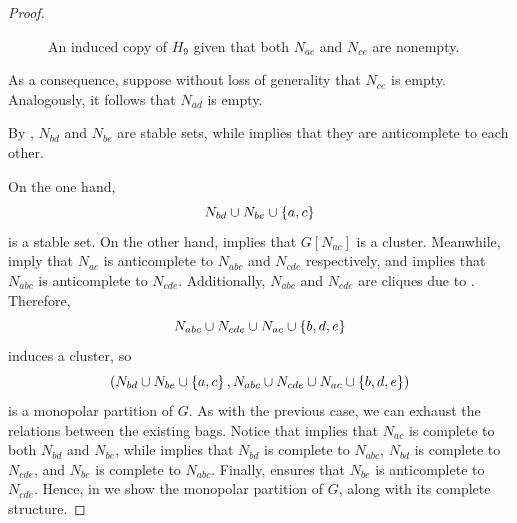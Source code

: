\begin{proof}
\begin{figure}[htb!]
        \caption{An induced copy of $H_9$ given that both $N_{ac}$ and $N_{ce}$ are nonempty.}
        \label{fig:two_2_bags_nonempty}
    \end{figure}

    As a consequence, suppose without loss of generality that $N_{ce}$ is empty.
    Analogously, it follows that $N_{ad}$ is empty.

    By , $N_{bd}$ and $N_{be}$ are stable sets, while
     implies that they are anticomplete to each other.
    
    On the one hand,
    \[
        N_{bd} \cup N_{be} \cup \left\{a,c\right\}
    \]
    is a stable set. On the other hand,  implies that
    $G[N_{ac}]$ is a cluster. Meanwhile,
     imply that $N_{ac}$ is
    anticomplete to $N_{abc}$ and $N_{cde}$ respectively, and
     implies that $N_{abc}$ is anticomplete to
    $N_{cde}$. Additionally, $N_{abc}$ and $N_{cde}$ are cliques due to
    . Therefore, 
    \[
        N_{abc}\cup N_{cde} \cup N_{ac} \cup \left\{b,d,e\right\}
    \]
    induces a cluster, so
    \[
        \left(N_{bd} \cup N_{be} \cup \left\{a,c\right\} , N_{abc}\cup N_{cde} \cup N_{ac} 
        \cup \left\{b,d,e\right\}\right)
    \]
    is a monopolar partition of $G$. As with the previous case, we can exhaust
    the relations between the existing bags. Notice that 
    implies that $N_{ac}$ is complete to both $N_{bd}$ and $N_{be}$, while
     implies that $N_{bd}$ is complete to $N_{abc}$,
    $N_{bd}$ is complete to $N_{cde}$, and $N_{be}$ is complete to $N_{abc}$.
    Finally,  ensures that $N_{be}$ is anticomplete to
    $N_{cde}$. Hence, in  we show the monopolar
    partition of $G$, along with its complete structure.


\end{proof}
